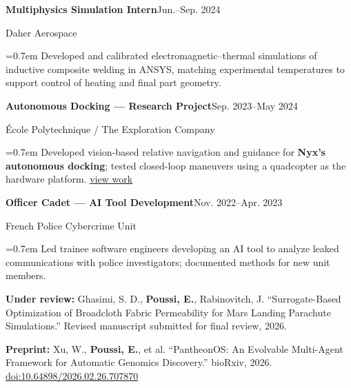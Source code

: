 \documentclass[10pt,letterpaper]{article}
\begin{document}
\vspace{2pt}\textbf{Multiphysics Simulation Intern}\hfill Jun.--Sep. 2024\par
Daher Aerospace\par
\hangindent=0.7em \textbullet{} Developed and calibrated electromagnetic--thermal simulations of inductive composite welding in ANSYS, matching experimental temperatures to support control of heating and final part geometry.\par
\vspace{2pt}\textbf{Autonomous Docking --- Research Project}\hfill Sep. 2023--May 2024\par
École Polytechnique / The Exploration Company\par
\hangindent=0.7em \textbullet{} Developed vision-based relative navigation and guidance for \textbf{Nyx's autonomous docking}; tested closed-loop maneuvers using a quadcopter as the hardware platform. \href{https://rwin2.github.io/erwinpoussi.github.io/project/visual-based-docking/}{\underline{view work}}\par
\vspace{2pt}\textbf{Officer Cadet --- AI Tool Development}\hfill Nov. 2022--Apr. 2023\par
French Police Cybercrime Unit\par
\hangindent=0.7em \textbullet{} Led trainee software engineers developing an AI tool to analyze leaked communications with police investigators; documented methods for new unit members.\par
{}\par\vspace{1pt}{\color{navy!40}\hrule}\vspace{2pt}
\textbf{Under review:} Ghasimi, S. D., \textbf{Poussi, E.}, Rabinovitch, J. ``Surrogate-Based Optimization of Broadcloth Fabric Permeability for Mars Landing Parachute Simulations.'' Revised manuscript submitted for final review, 2026.\par
\textbf{Preprint:} Xu, W., \textbf{Poussi, E.}, et al. ``PantheonOS: An Evolvable Multi-Agent Framework for Automatic Genomics Discovery.'' bioRxiv, 2026. \href{https://doi.org/10.64898/2026.02.26.707870}{\underline{doi:10.64898/2026.02.26.707870}}\par
{}\par\vspace{1pt}{\color{navy!40}\hrule}\vspace{2pt}
\end{document}
